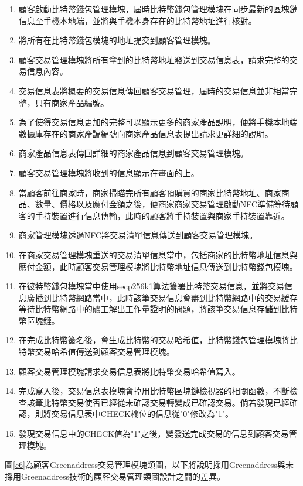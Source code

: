 	\begin{enumerate}
		\item 顧客啟動比特幣錢包管理模塊，屆時比特幣錢包管理模塊在同步最新的區塊鏈信息至手機本地端，並將與手機本身存在的比特幣地址進行核對。
		\item 將所有在比特幣錢包模塊的地址提交到顧客管理模塊。
		\item 顧客交易管理模塊將所有拿到的比特幣地址發送到交易信息表，請求完整的交易信息內容。
		\item 交易信息表將概要的交易信息傳回顧客交易管理，屆時的交易信息並非相當完整，只有商家產品編號。
		\item 為了使得交易信息更加的完整可以顯示更多的商家產品說明，便將手機本地端數據庫存在的商家產諞編號向商家產品信息表提出請求更詳細的說明。
		\item 商家產品信息表傳回詳細的商家產品信息到顧客交易管理模塊。
		\item 顧客交易管理模塊將收到的信息顯示在畫面的上。
		\item 當顧客前往商家時，商家掃瞄完所有顧客預購買的商家比特幣地址、商家商品、數量、價格以及應付金額之後，便商家商家交易管理啟動NFC準備等待顧客的手持裝置進行信息傳輸，此時的顧客將手持裝置與商家手持裝置靠近。
		\item 商家管理模塊透過NFC將交易清單信息傳送到顧客交易管理模塊。
		\item 在商家交易管理模塊重送的交易清單信息當中，包括商家的比特幣地址信息與應付金額，此時顧客交易管理模塊將比特幣地址信息傳送到比特幣錢包模塊。
		\item 在彼特幣錢包模塊當中使用secp256k1算法簽署比特幣交易信息，並將交易信息廣播到比特幣網路當中，此時該筆交易信息會盡到比特幣網路中的交易緩存等待比特幣網路中的礦工解出工作量證明的問題，將該筆交易信息存儲到比特幣區塊鏈。
		\item 在完成比特幣簽名後，會生成比特幣的交易哈希值，比特幣錢包管理模塊將比特幣交易哈希值傳送到顧客交易管理模塊。
		\item 顧客交易管理模塊請求交易信息表將比特幣交易哈希值寫入。
		\item 完成寫入後，交易信息表模塊會掉用比特幣區塊鏈檢視器的相關函數，不斷檢查該筆比特幣交易使否已經從未確認交易轉變成已確認交易。倘若發現已經確認，則將交易信息表中CHECK欄位的信息從"0"修改為"1"。
		\item 發現交易信息中的CHECK值為"1"之後，變發送完成交易的信息到顧客交易管理模塊。
	\end{enumerate}

	圖\ref{c6}為顧客Greenaddress交易管理模塊類圖，以下將說明採用Greenaddress與未採用Greenaddress技術的顧客交易管理類圖設計之間的差異。

